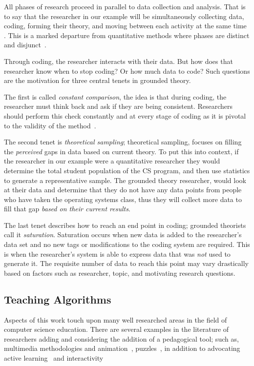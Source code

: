 \documentclass[sigconf]{acmart}
\begin{document}
All phases of research proceed in parallel to data collection and analysis.
That is to say that the researcher in our example will be simultaneously
collecting data, coding, forming their theory, and moving between each activity
at the same time . This is a marked departure from quantitative methods where
phases are distinct and disjunct~\cite{Strauss67discoveryof}.


Through coding, the researcher interacts with their data. But how does that
researcher know when to stop coding? Or how much data to code? Such questions
are the motivation for three central tenets in grounded theory.
 
The first is called \emph{constant comparison}, the idea is that during coding,
the researcher must think back and ask if they are being consistent. Researchers
should perform this check constantly and at every stage of coding as it is
pivotal to the validity of the method~\cite{Strauss67discoveryof}.
 
The second tenet is \emph{theoretical sampling}; theoretical sampling, focuses
on filling the \emph{perceived} gaps in data based on current theory. To put
this into context, if the researcher in our example were a quantitative
researcher they would determine the total student population of the CS program,
and then use statistics to generate a representative sample. The grounded
theory researcher, would look at their data and determine that they do not have
any data points from people who have taken the operating systems class, thus
they will collect more data to fill that gap \emph{based on their current
  results}.
 
The last tenet describes how to reach an end point in coding; grounded theorists
call it \emph{saturation}. Saturation occurs when new data is added to the
researcher's data set and no new tags or modifications to the coding system are
required. This is when the researcher's system is able to express data that was
\emph{not} used to generate it. The requisite number of data to reach this point
may vary drastically based on factors such as researcher, topic, and motivating
research questions.

\subsection{Teaching Algorithms}
\label{sec:back:rw}

Aspects of this work touch upon many well researched areas in the field of
computer science education. There are several examples in the literature of
researchers adding and considering the addition of a pedagogical tool; such as,
multimedia methodologies and animation~\cite{baecker1981sorting,
  Naps:2002:ERV:782941.782998, Grissom:2003:AVC:774833.774846, HANSEN2002291},
puzzles~\cite{Levitin:2002:UPT:563517.563456}, in addition to advocating active
learning~\cite{McConnell:1996:ALU:1013718.237526} and
interactivity~\cite{Rodger:1995:ILA:199691.199820}
\end{document}
